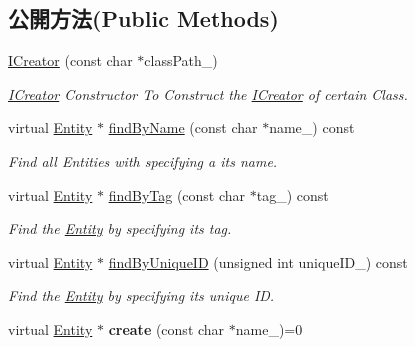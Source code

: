\subsection*{公開方法(Public Methods)}
\begin{DoxyCompactItemize}
\item 
\hyperlink{class_i_dream_sky_1_1_entity_1_1_i_creator_a99e69c3d049b03f808bab699f0dc8e00}{I\+Creator} (const char $\ast$class\+Path\+\_\+)
\begin{DoxyCompactList}\small\item\em \hyperlink{class_i_dream_sky_1_1_entity_1_1_i_creator}{I\+Creator} Constructor To Construct the \hyperlink{class_i_dream_sky_1_1_entity_1_1_i_creator}{I\+Creator} of certain Class. \end{DoxyCompactList}\item 
virtual \hyperlink{class_i_dream_sky_1_1_entity}{Entity} $\ast$ \hyperlink{class_i_dream_sky_1_1_entity_1_1_i_creator_a7139f0c44bd82a9cf79e3ad3072987d2}{find\+By\+Name} (const char $\ast$name\+\_\+) const 
\begin{DoxyCompactList}\small\item\em Find all Entities with specifying a its name. \end{DoxyCompactList}\item 
virtual \hyperlink{class_i_dream_sky_1_1_entity}{Entity} $\ast$ \hyperlink{class_i_dream_sky_1_1_entity_1_1_i_creator_abb901d7d8b5fa6649400fb06275b7aa5}{find\+By\+Tag} (const char $\ast$tag\+\_\+) const 
\begin{DoxyCompactList}\small\item\em Find the \hyperlink{class_i_dream_sky_1_1_entity}{Entity} by specifying its tag. \end{DoxyCompactList}\item 
virtual \hyperlink{class_i_dream_sky_1_1_entity}{Entity} $\ast$ \hyperlink{class_i_dream_sky_1_1_entity_1_1_i_creator_af3d9481e1c498d25d2cc07dd38b9380c}{find\+By\+Unique\+ID} (unsigned int unique\+I\+D\+\_\+) const 
\begin{DoxyCompactList}\small\item\em Find the \hyperlink{class_i_dream_sky_1_1_entity}{Entity} by specifying its unique ID. \end{DoxyCompactList}\item 
virtual \hyperlink{class_i_dream_sky_1_1_entity}{Entity} $\ast$ {\bfseries create} (const char $\ast$name\+\_\+)=0\hypertarget{class_i_dream_sky_1_1_entity_1_1_i_creator_a74d173806f3f0456209001206430a4b5}{}\label{class_i_dream_sky_1_1_entity_1_1_i_creator_a74d173806f3f0456209001206430a4b5}


\end{DoxyCompactItemize}
